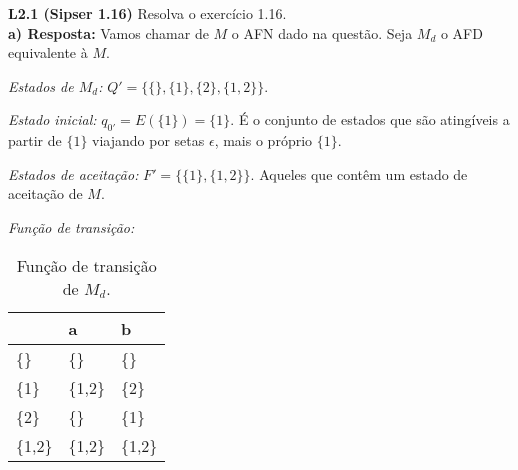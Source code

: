 
\noindent \textbf{L2.1 (Sipser 1.16)} Resolva o exercício 1.16.\\[3pt]
\noindent\textbf{a) Resposta:} Vamos chamar de $M$ o AFN dado na questão. Seja $M_d$ o AFD equivalente à $M$.

\noindent\textit{Estados de $M_d$:} $Q' = \{\{\}, \{1\}, \{2\}, \{1,2\} \}$.

\noindent\textit{Estado inicial:} $q_{0'} = E(\{1\}) = \{1\}$. É o conjunto de estados que são atingíveis a partir de $\{1\}$ viajando por setas $\epsilon$, mais o próprio $\{1\}$.

\noindent\textit{Estados de aceitação:} $F' = \{\{1\}, \{1,2\}\}$. Aqueles que contêm um estado de aceitação de $M$.

\noindent\textit{Função de transição:}
\begin{table}[!h]
\centering
{}
\begin{tabular}{l|l|l}
         & a         & b        \\ \hline
\{\}     & \{\}      & \{\}     \\
\{1\}    & \{1,2\}   & \{2\}    \\
\{2\}    & \{\}      & \{1\}    \\
\{1,2\}  & \{1,2\}   & \{1,2\}
\end{tabular}
\caption{Função de transição de $M_d$.}\vspace*{0.2cm}
\label{tbl:sip1.16a}
\end{table}

